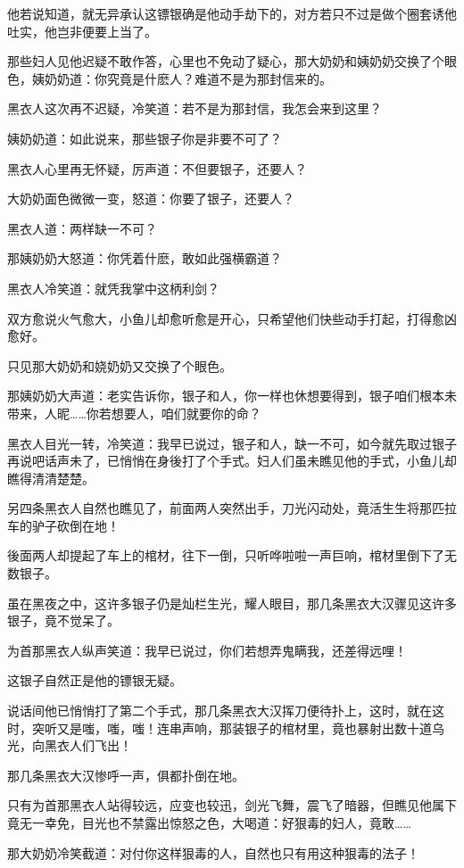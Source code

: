 \documentclass[12pt,oneside]{book}
\begin{document}
他若说知道，就无异承认这镖银确是他动手劫下的，对方若只不过是做个圈套诱他吐实，他岂非便要上当了。

那些妇人见他迟疑不敢作答，心里也不免动了疑心，那大奶奶和姨奶奶交换了个眼色，姨奶奶道：你究竟是什麽人？难道不是为那封信来的。

黑衣人这次再不迟疑，冷笑道：若不是为那封信，我怎会来到这里？

姨奶奶道：如此说来，那些银子你是非要不可了？

黑衣人心里再无怀疑，厉声道：不但要银子，还要人？

大奶奶面色微微一变，怒道：你要了银子，还要人？

黑衣人道：两样缺一不可？

那姨奶奶大怒道：你凭着什麽，敢如此强横霸道？

黑衣人冷笑道：就凭我掌中这柄利剑？

双方愈说火气愈大，小鱼儿却愈听愈是开心，只希望他们快些动手打起，打得愈凶愈好。

只见那大奶奶和娆奶奶又交换了个眼色。

那姨奶奶大声道：老实告诉你，银子和人，你一样也休想要得到，银子咱们根本未带来，人昵\ldots\ldots 你若想要人，咱们就要你的命？

黑衣人目光一转，冷笑道：我早已说过，银子和人，缺一不可，如今就先取过银子再说吧话声未了，已悄悄在身後打了个手式。妇人们虽未瞧见他的手式，小鱼儿却瞧得清清楚楚。

另四条黑衣人自然也瞧见了，前面两人突然出手，刀光闪动处，竟活生生将那匹拉车的驴子砍倒在地！

後面两人却提起了车上的棺材，往下一倒，只听哗啦啦一声巨响，棺材里倒下了无数银子。

虽在黑夜之中，这许多银子仍是灿栏生光，耀人眼目，那几条黑衣大汉骤见这许多银子，竟不觉呆了。

为首那黑衣人纵声笑道：我早已说过，你们若想弄鬼瞒我，还差得远哩！

这银子自然正是他的镖银无疑。

说话间他已悄悄打了第二个手式，那几条黑衣大汉挥刀便待扑上，这时，就在这时，突听又是嗤，嗤，嗤！连串声响，那装银子的棺材里，竟也暴射出数十道乌光，向黑衣人们飞出！

那几条黑衣大汉惨呼一声，俱都扑倒在地。

只有为首那黑衣人站得较远，应变也较迅，剑光飞舞，震飞了暗器，但瞧见他属下竟无一幸免，目光也不禁露出惊怒之色，大喝道：好狠毒的妇人，竟敢\ldots\ldots{}

那大奶奶冷笑截道：对付你这样狠毒的人，自然也只有用这种狠毒的法子！
\end{document}

